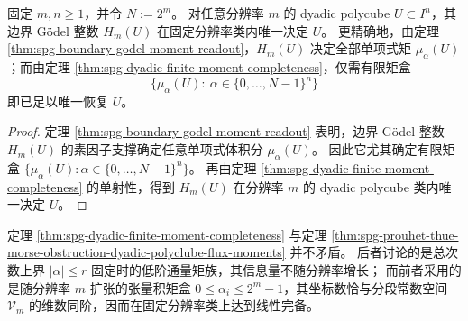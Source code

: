 \begin{corollary}\label{cor:spg-boundary-godel-finite-moment-completeness}
固定 \(m,n\ge 1\)，并令 \(N:=2^m\)。
对任意分辨率 \(m\) 的 dyadic polycube \(U\subset I^n\)，其边界 Gödel 整数 \(H_m(U)\) 在固定分辨率类内唯一决定 \(U\)。
更精确地，由定理 \ref{thm:spg-boundary-godel-moment-readout}，\(H_m(U)\) 决定全部单项式矩 \(\mu_{\alpha}(U)\)；而由定理 \ref{thm:spg-dyadic-finite-moment-completeness}，仅需有限矩盒
\[
\bigl\{\mu_{\alpha}(U):\ \alpha\in\{0,\dots,N-1\}^{n}\bigr\}
\]
即已足以唯一恢复 \(U\)。
\end{corollary}
\begin{proof}
定理 \ref{thm:spg-boundary-godel-moment-readout} 表明，边界 Gödel 整数 \(H_m(U)\) 的素因子支撑确定任意单项式体积分 \(\mu_{\alpha}(U)\)。
因此它尤其确定有限矩盒
\(
\{\mu_{\alpha}(U):\alpha\in\{0,\dots,N-1\}^{n}\}
\)。
再由定理 \ref{thm:spg-dyadic-finite-moment-completeness} 的单射性，得到 \(H_m(U)\) 在分辨率 \(m\) 的 dyadic polycube 类内唯一决定 \(U\)。
\end{proof}

\begin{remark}[与低阶通量矩障碍的相容性]\label{rem:spg-dyadic-finite-moment-completeness-vs-obstruction}
定理 \ref{thm:spg-dyadic-finite-moment-completeness} 与定理 \ref{thm:spg-prouhet-thue-morse-obstruction-dyadic-polyclube-flux-moments} 并不矛盾。
后者讨论的是总次数上界 \(|\alpha|\le r\) 固定时的低阶通量矩族，其信息量不随分辨率增长；
而前者采用的是随分辨率 \(m\) 扩张的张量积矩盒 \(0\le \alpha_i\le 2^m-1\)，其坐标数恰与分段常数空间 \(\mathcal V_m\) 的维数同阶，因而在固定分辨率类上达到线性完备。
\end{remark}

\endinput
